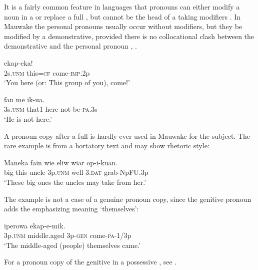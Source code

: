 It is a fairly common feature in languages that pronouns can either modify a noun in a  or replace a full , but cannot be the head of a  taking modifiers \citep[e.g.][]{ HakulinenEtAl1979,Saari1985,Roberts1987}. In Mauwake the personal pronouns usually occur without modifiers, but they  be modified by a demonstrative, provided there is no collocational clash between the demonstrative and the personal pronoun , . 

\ea%
\label{ex:3:x530}
\gll {}  ekap-eka! \\
2s.\textsc{unm} this=\textsc{cf} come-\textsc{imp}.2p\\
\glt`You here (or: This group of you), come!'
\z

\ea%
\label{ex:3:x531}
\gll {}  fan me ik-ua. \\
3s.\textsc{unm} that1 here not be-\textsc{pa}.3s\\
\glt`He is not here.'
\z

A pronoun copy after a full  is hardly ever used in Mauwake for the subject. The rare example  is from a hortatory text and may show rhetoric style:

\ea%
\label{ex:3:x683}
\gll Maneka fain {\ob}wie  eliw wiar op-i-kuan. \\
big this uncle 3p.\textsc{unm} well 3.\textsc{dat} grab-NpFU.3p\\
\glt`These big ones the uncles may take from her.'
\z

The example  is not a case of a genuine pronoun copy, since the genitive pronoun  adds the emphasizing meaning `themselves':

\ea%
\label{ex:3:x532}
\gll {}  iperowa  ekap-e-mik. \\
3p.\textsc{unm} middle.aged 3p-\textsc{gen} come-\textsc{pa}-1/3p\\
\glt`The middle-aged (people) themselves came.' 
\z

For a pronoun copy of the genitive in a possessive , see .

